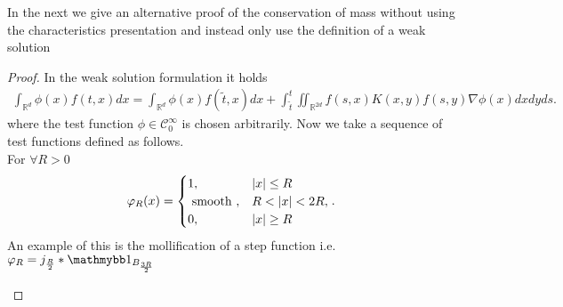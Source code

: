 In the next we give an alternative proof of the conservation of mass without using the characteristics presentation and instead only use 
the definition of a weak solution\\[1ex]
\begin{proof}
 In the weak solution formulation  it holds 
 \begin{align*}
   \int_{\mathbb{R}^{d} }\phi(x) f(t,x) dx = \int_{\mathbb{R}^{d} }\phi(x)f(\tilde{t},x ) dx + \int_{\tilde{t} }^{t} \iint_{\mathbb{R}^{2d} } f(s,x)K(x,y)f(s,y)\nabla \phi (x) dx dy ds
 .\end{align*}
 where the test function $\phi  \in  \mathcal{C}_0^{\infty} $ is chosen arbitrarily. Now we take a sequence of test functions defined as follows. \\[1ex]
 For $\forall  R >0$ 
 \begin{align*}
  \varphi_R(x) = \begin{cases}
    1 ,& \lvert x\rvert \le R\\
    \text{ smooth } ,& R < \lvert x\rvert < 2R,\\
    0 ,& \lvert x\rvert \ge R
  \end{cases}
 .\end{align*}
 An example of this is the mollification of a step function i.e. $\phi_R = j_{\frac{R}{2}}*\cha_{B_{\frac{3R}{2}}}$
\begin{figure}[H]
   \begin{center}
\end{center}
\end{figure}
\end{proof}
